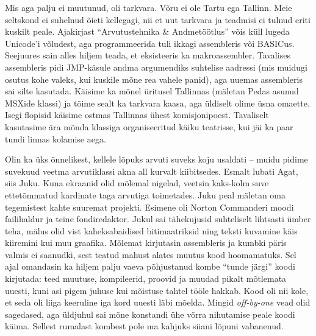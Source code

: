 Mis aga palju ei muutunud, oli tarkvara. Võru ei ole Tartu ega 
Tallinn. Meie seltskond ei suhelnud õieti kellegagi, nii et uut tarkvara ja
teadmisi ei tulnud eriti kuskilt peale. Ajakirjast \enquote{Arvutustehnika \& 
Andmetöötlus} 
võis küll lugeda Unicode'i võludest, aga programmeerida tuli ikkagi 
assembleris või BASICus. Seejuures sain alles hiljem teada, et eksisteeris 
ka makroassembler. Tavalises assembleris pidi JMP-käsule andma argumendiks 
suhtelise aadressi (mis muidugi osutus kohe valeks, kui kuskile mõne rea 
vahele panid), aga 
uuemas assembleris sai silte kasutada. Käisime ka mõnel üritusel Tallinnas (mäletan 
Pedas asunud MSXide klassi) 
ja tõime sealt ka tarkvara kaasa, aga üldiselt olime üsna omaette. Isegi 
flopisid käisime ostmas Tallinnas ühest komisjonipoest. Tavaliselt kasutasime ära mõnda klassiga organiseeritud käiku teatrisse, kui jäi 
ka paar tundi linnas kolamise aega. 

Olin ka üks õnnelikest, kellele lõpuks arvuti suveks koju usaldati -- muidu pidime 
suvekuud veetma arvutiklassi akna all kurvalt kiibitsedes. Esmalt lubati
Agat, siis Juku. Kuna ekraanid olid mõlemal nigelad, veetsin kaks-kolm suve 
ettetõmmatud kardinate taga arvutiga toimetades. Juku peal mäletan oma tegemistest kahte 
suuremat projekti. Esimene oli Norton Commanderi moodi failihaldur ja teine 
fondiredaktor. Jukul sai tähekujusid suhteliselt lihtsasti ümber teha, mälus 
olid vist kaheksabaidised bitimaatriksid ning teksti kuvamine käis kiiremini 
kui muu graafika. Mõlemat kirjutasin assembleris ja kumbki päris valmis ei 
saanudki, sest teatud mahust alates muutus kood hoomamatuks. Sel ajal omandasin 
ka hiljem palju vaeva põhjustanud kombe \enquote{tunde järgi} koodi kirjutada: 
teed muutuse, kompileerid, proovid ja muudad pikalt mõtlemata uuesti, kuni 
asi pigem juhuse kui mõistuse tahtel tööle hakkab. Kood oli
nii kole, et seda oli liiga keeruline iga kord uuesti läbi mõelda. Mingid 
\emph{off-by-one} vead olid sagedased, aga üldjuhul sai mõne konstandi ühe võrra 
nihutamise peale koodi käima. Sellest rumalast kombest pole ma kahjuks siiani lõpuni 
vabanenud. 

